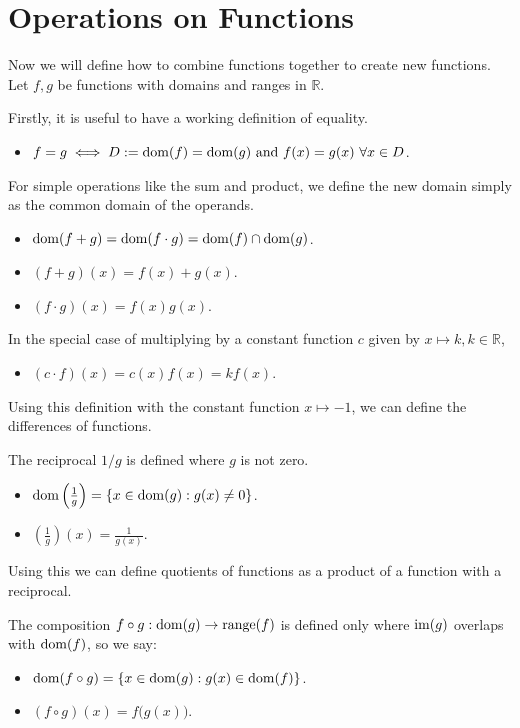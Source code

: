 \documentclass[../real_analysis.tex]{subfiles}
\begin{document}
    \section{Operations on Functions}
        Now we will define how to combine functions together to create new functions. Let $f, g$ be functions with domains and ranges in $\mathbb{R}$.
        \begin{definition}
            Firstly, it is useful to have a working definition of equality.
            \begin{itemize}
                \item $f = g \iff D:= \dom(f) = \dom(g)\ \text{and}\ f(x) = g(x)\ \forall x \in D$.
            \end{itemize}
            For simple operations like the sum and product, we define the new domain simply as the common domain of the operands.
            \begin{itemize}
                \item $\operatorname{dom}(f+g) = \operatorname{dom}(f \cdot g) = \operatorname{dom}(f) \cap \operatorname{dom}(g)$.
                \item $(f+g)(x) = f(x) + g(x)$.
                \item $(f \cdot g)(x) = f(x)g(x)$.
            \end{itemize}
            In the special case of multiplying by a constant function $c$ given by $x \mapsto k, k \in \mathbb{R}$,
            \begin{itemize}
                \item $(c \cdot f)(x) = c(x)f(x) = kf(x)$.
            \end{itemize}
            Using this definition with the constant function $x \mapsto -1$, we can define the differences of functions.

            The reciprocal $1 / g$ is defined where $g$ is not zero.
            \begin{itemize}
                \item $\operatorname{dom}\left(\frac{1}{g}\right) = \{x \in \operatorname{dom}(g) : g(x) \ne 0\}$.
                \item $\left(\frac{1}{g}\right)(x) = \frac{1}{g(x)}$.
            \end{itemize}
            Using this we can define quotients of functions as a product of a function with a reciprocal.
        \end{definition}
        \begin{definition}[Composition]
            The composition $f \circ g: \operatorname{dom}(g) \to \operatorname{range}(f)$ is defined only where $\operatorname{im}(g)$ overlaps with $\operatorname{dom}(f)$, so we say:
            \begin{itemize}
                \item $\operatorname{dom}(f \circ g) = \{x \in \operatorname{dom}(g) : g(x) \in \operatorname{dom}(f)\}$.
                \item $(f \circ g)(x) = f\big(g(x)\big)$.
            \end{itemize}
        \end{definition}
\end{document}
